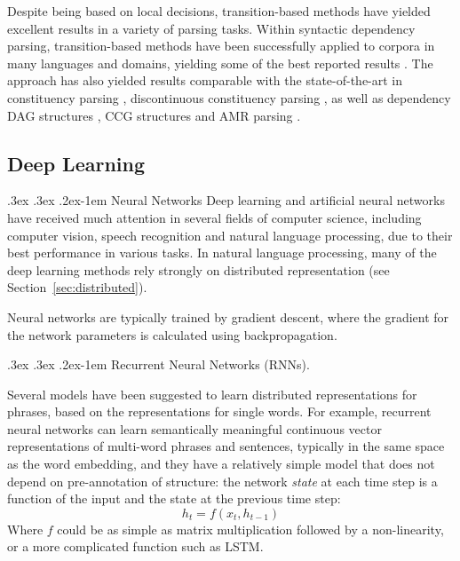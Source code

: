\documentclass[11pt]{article}
\makeatletter
\newcommand{\secref}[1]{Section~\ref{#1}}
\renewcommand{\paragraph}{
  \@startsection{paragraph}{4}
  {\z@}{.3ex \@plus .3ex \@minus .2ex}{-1em}
  {\normalfont\normalsize\bfseries}
}
\makeatother
\begin{document}
Despite being based on local decisions, transition-based methods have yielded excellent
results in a variety of parsing tasks.
Within syntactic dependency parsing, transition-based methods
have been successfully applied to corpora in many languages and domains, yielding some
of the best reported results \cite{dyer2015transition,ballesteros2015improved}. 
The approach has also yielded results comparable with the state-of-the-art in
constituency parsing \cite{sagae2005classifier,zhang2009transition,zhu2013fast},
discontinuous constituency parsing \cite{maier2015discontinuous},
as well as dependency DAG structures
\cite{sagae2008shift,tokgoz2015transition}, CCG structures \cite{ambati2015incremental}
and AMR parsing \cite{wang2015transition}.


\subsection{Deep Learning}\label{sec:deep_learning}

\paragraph{Neural Networks}
Deep learning and artificial neural networks have received much attention in
several fields of computer science, including computer vision, speech
recognition and natural language processing, due to their best performance in
various tasks\cite{collobert2011nlp}.
In natural language processing, many of the deep learning methods rely strongly
on distributed representation (see \secref{sec:distributed}).

Neural networks are typically trained by gradient descent, where the gradient for the network parameters
is calculated using backpropagation.

\paragraph{Recurrent Neural Networks (RNNs).}

Several models have been suggested to learn distributed representations for
phrases, based on the representations for single words.
For example, recurrent neural networks can learn semantically meaningful
continuous vector representations of multi-word phrases and sentences,
typically in the same space as the word embedding, and they have a relatively
simple model that does not depend on pre-annotation of structure:
the network \textit{state} at each time step is a function of the input and
the state at the previous time step:
\[
  h_t=f(x_t,h_{t-1})
\]
Where $f$ could be as simple as matrix multiplication followed by a non-linearity,
or a more complicated function such as LSTM.
\end{document}

